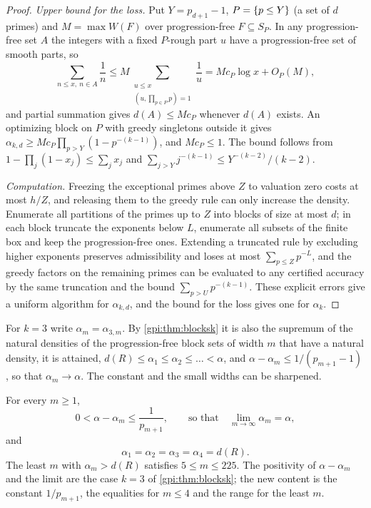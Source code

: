 \begin{proof}
\emph{Upper bound for the loss.} Put $Y=p_{d+1}-1$, $P=\{p\le Y\}$ (a set of $d$ primes) and
$M=\max W(F)$ over progression-free $F\subseteq S_P$. In any progression-free set $A$ the integers
with a fixed $P$-rough part $u$ have a progression-free set of smooth parts, so
\[
 \sum_{n\le x,\ n\in A}\frac1n\le M\sum_{\substack{u\le x\\(u,\prod_{p\in P}p)=1}}\frac1u=Mc_P\log x+O_P(M),
\]
and partial summation gives $d(A)\le Mc_P$ whenever $d(A)$ exists. An optimizing block on $P$ with
greedy singletons outside it gives $\alpha_{k,d}\ge Mc_P\prod_{p>Y}(1-p^{-(k-1)})$, and $Mc_P\le1$. The
bound follows from $1-\prod_j(1-x_j)\le\sum_jx_j$ and $\sum_{j>Y}j^{-(k-1)}\le Y^{-(k-2)}/(k-2)$.

\emph{Computation.} Freezing the exceptional primes above $Z$ to valuation zero costs at most $h/Z$,
and releasing them to the greedy rule can only increase the density. Enumerate all partitions of
the primes up to $Z$ into blocks of size at most $d$; in each block truncate the exponents below
$L$, enumerate all subsets of the finite box and keep the progression-free ones. Extending a
truncated rule by excluding higher exponents preserves admissibility and loses at most
$\sum_{p\le Z}p^{-L}$, and the greedy factors on the remaining primes can be evaluated to any certified
accuracy by the same truncation and the bound $\sum_{p>U}p^{-(k-1)}$. These explicit errors give a
uniform algorithm for $\alpha_{k,d}$, and the bound for the loss gives one for $\alpha_k$.
\end{proof}

For $k=3$ write $\alpha_m=\alpha_{3,m}$. By \cref{gpi:thm:blocksk} it is also the supremum of the
natural densities of the progression-free block sets of width $m$ that have a natural density, it is
attained, $d(R)\le\alpha_1\le\alpha_2\le\dots<\alpha$, and $\alpha-\alpha_m\le1/(p_{m+1}-1)$, so
that $\alpha_m\to\alpha$. The constant and the small widths can be sharpened.

\begin{theorem}\label{gpi:thm:blocks}
For every $m\ge1$,
\[
 0<\alpha-\alpha_m\le\frac1{p_{m+1}},\qquad\text{so that}\quad\lim_{m\to\infty}\alpha_m=\alpha ,
\]
and
\[
 \alpha_1=\alpha_2=\alpha_3=\alpha_4=d(R).
\]
The least $m$ with $\alpha_m>d(R)$ satisfies $5\le m\le225$. The positivity of $\alpha-\alpha_m$
and the limit are the case $k=3$ of \cref{gpi:thm:blocksk}; the new content is the constant
$1/p_{m+1}$, the equalities for $m\le4$ and the range for the least $m$.
\end{theorem}


